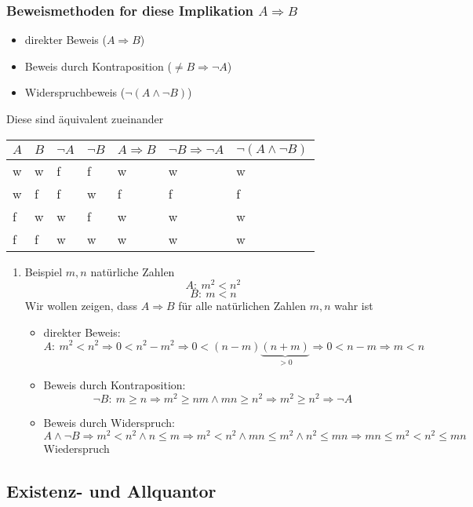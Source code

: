 \documentclass[11pt]{article}
\begin{document}
\subsubsection{Beweismethoden for diese Implikation $A\Rightarrow B$}
\label{sec-2-2-2}
\begin{itemize}
\item direkter Beweis ($A\Rightarrow B$)
\item Beweis durch Kontraposition ($\neq B \Rightarrow \neg A$)
\item Widerspruchbeweis ($\neg (A\wedge \neg B)$)
\end{itemize}
Diese sind äquivalent zueinander
\begin{center}
\begin{tabular}{lllllll}
$A$ & $B$ & $\neg A$ & $\neg B$ & $A\Rightarrow B$ & $\neg B \Rightarrow \neg A$ & $\neg (A \wedge \neg B)$\\
\hline
w & w & f & f & w & w & w\\
w & f & f & w & f & f & f\\
f & w & w & f & w & w & w\\
f & f & w & w & w & w & w\\
\end{tabular}
\end{center}
\begin{enumerate}
\item Beispiel
\label{sec-2-2-2-1}
$m,n$ natürliche Zahlen \\
     \[A:~m^2 < n^2\]
\[B:~m < n\]
Wir wollen zeigen, dass $A\Rightarrow B$ für alle natürlichen Zahlen $m,n$ wahr ist
\begin{itemize}
\item direkter Beweis: \\
       \[A:~m^2 < n^2 \Rightarrow 0 < n^2 - m^2 \Rightarrow 0 < (n-m)\underbrace{(n+m)}_{>0} \Rightarrow 0 < n-m \Rightarrow m<n\]
\item Beweis durch Kontraposition: \\
       \[\neg B:~m \geq n \Rightarrow m^2\geq n m \wedge m n \geq n^2 \Rightarrow m^2 \geq n^2 \Rightarrow \neg A\]
\item Beweis durch Widerspruch: \\
       \[A\wedge \neg B \Rightarrow m^2 < n^2 \wedge n\leq m \Rightarrow m^2 < n^2 \wedge m n \leq m^2 \wedge n^2 \leq m n \Rightarrow m n \leq m^2 < n^2 \leq m n\]
       Wiederspruch
\end{itemize}
\end{enumerate}
\subsection{Existenz- und Allquantor}
\label{sec-2-3}
\end{document}

